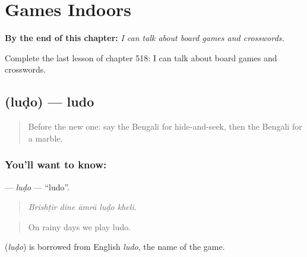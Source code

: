 
\chapter{Games Indoors}
\label{ch:bn-games-indoors}

\begin{chapteropening}
\textbf{By the end of this chapter:} \emph{I can talk about board games and crosswords.}

Complete the last lesson of chapter 518: I can talk about board games and crosswords.
\end{chapteropening}

\section[\texorpdfstring{\bn{লুডো} (luḍo)}{লুডো (luḍo)}]{ (luḍo) — ludo}

\label{lesson:BN-C518-ludo}



\begin{quote}
Before the new one: say the Bengali for hide-and-seek, then the Bengali for a marble.
\end{quote}

\subsection*{You'll want to know: }
\textbf{} — \emph{luḍo} — \textquotedblleft{}ludo\textquotedblright{}.

\begin{quote}
    
\end{quote}

\begin{quote}
\emph{Brishṭir dine āmrā luḍo kheli.}
\end{quote}

\begin{quote}
On rainy days we play ludo.
\end{quote}

\begin{cousinweb}
\textbf{} (\emph{luḍo}) is borrowed from English \emph{ludo}, the name of the game.
\end{cousinweb}


